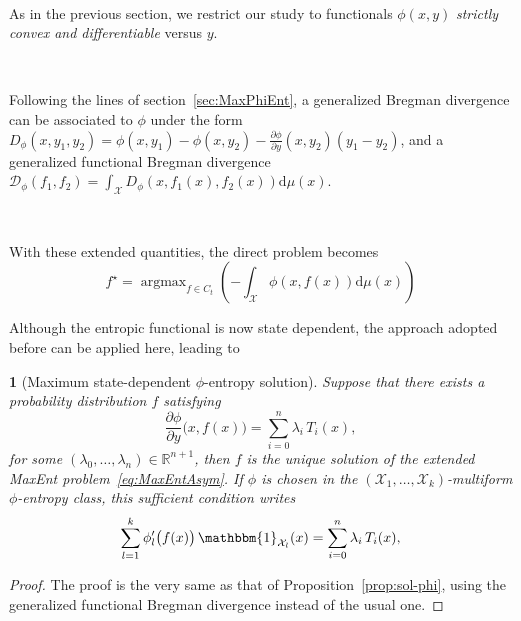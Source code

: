 \documentclass[english,sort&compress]{elsarticle}
\theoremstyle{definition}
\theoremstyle{plain}
\newtheorem{prop}{\protect\propositionname}
\theoremstyle{plain}
\providecommand{\propositionname}{Proposition}
\def\dmu{\mathrm{d}\mu}
\def\fD{\mathcal{D}}
\def\Rset{\mathbb{R}}
\def\X{\mathcal{X}}
\def\un{\mathbbm{1}}
\DeclareMathOperator*{\argmax}{\operatorname{argmax}}
\begin{document}
\

As in  the previous  section, we restrict  our study to  functionals $\phi(x,y)$
{\em strictly convex and differentiable} versus $y$.

\

Following  the  lines  of  section~\ref{sec:MaxPhiEnt},  a  generalized  Bregman
divergence  can be  associated to  $\phi$  under the  form $D_\phi(x,y_1,y_2)  =
\phi(x,y_1) - \phi(x,y_2) - \frac{\partial \phi}{\partial y}(x,y_2) \left( y_1 -
  y_2 \right)$,  and a generalized functional  Bregman divergence $\displaystyle
\fD_\phi(f_1,f_2) = \int_\X D_\phi(x,f_1(x),f_2(x)) \dmu(x)$.

\

With these extended quantities, the direct problem becomes
%
\begin{equation}\label{eq:MaxEntAsym}
f^\star = \argmax_{f \in C_t} \left( - \int_\X \phi(x,f(x)) \dmu(x) \right)
\end{equation}

Although the  entropic functional is  now state dependent, the  approach adopted
before can be applied here, leading to

\begin{prop}[Maximum                state-dependent               $\phi$-entropy
  solution]\label{prop:sol-asym_phi}
%
  Suppose that there exists a probability distribution $f$ satisfying
  \begin{equation}\label{eq:sol-asym_phi}
  \frac{\partial \phi}{\partial y}\big(x,f(x)\big) = \sum_{i=0}^n \lambda_i \,
T_i(x),
  \end{equation}
  for  some  $(\lambda_0,\ldots,\lambda_n) \in  \Rset^{n+1}$,  then  $f$ is  the
  unique solution of  the extended MaxEnt problem~\eqref{eq:MaxEntAsym}.\newline
  If $\phi$ is  chosen in the $(\X_1 ,  \ldots , \X_k)$-multiform $\phi$-entropy
  class, this sufficient condition writes
  \begin{equation}\label{eq:sol-multiform_phi}
  \sum_{l=1}^k \phi_l'\big(f(x)\big) \, \un_{\X_l}(x) =
  \sum_{i=0}^n \lambda_i \, T_i(x),
  \end{equation}
\end{prop}
%
\begin{proof}
  The proof  is the very  same as that of  Proposition~\ref{prop:sol-phi}, using
  the generalized functional Bregman divergence instead of the usual one.
\end{proof}
\end{document}

